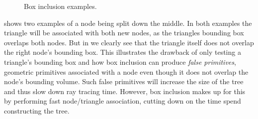 
\begin{figure}
  \centering
  \caption{Box inclusion examples.}
  \label{fig:boxInclusion}
\end{figure}


 shows two examples of a node being split
down the middle. In both examples the triangle will be associated with
both new nodes, as the triangles bounding box overlaps both nodes. But
in  we clearly see that the triangle
itself does not overlap the right node's bounding box. This
illustrates the drawback of only testing a triangle's bounding box and
how box inclusion can produce \textit{false primitives}, geometric
primitives associated with a node even though it does not overlap the
node's bounding volume. Such false primitives will increase the size
of the tree and thus slow down ray tracing time. However, box
inclusion makes up for this by performing fast node/triangle
association, cutting down on the time spend constructing the tree.









